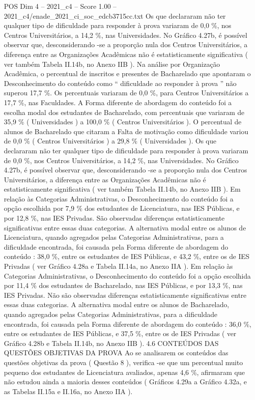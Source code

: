 \begin{textsample}{POS Dim 4 – 2021\_c4 – Score 1.00 – 2021\_c4/enade\_2021\_ci\_soc\_edcb3715cc.txt}
Os que declararam não ter qualquer tipo de dificuldade para responder à prova variaram de 0,0 \%, nos Centros Universitários, a 14,2 \%, nas Universidades.
No Gráfico 4.27b, é possível observar que, desconsiderando -se a proporção nula dos Centros Universitários, a diferença entre as Organizações Acadêmicas não é estatisticamente significativa ( ver também Tabela II.14b, no Anexo IIB ).
Na análise por Organização Acadêmica, o percentual de inscritos e presentes de Bacharelado que apontaram o Desconhecimento do conteúdo como “ dificuldade ao responder à prova ” não superou 17,7 \%.
Os percentuais variaram de 0,0 \%, para Centros Universitários a 17,7 \%, nas Faculdades.
A Forma diferente de abordagem do conteúdo foi a escolha modal dos estudantes de Bacharelado, com percentuais que variaram de 35,9 \% ( Universidades ) a 100,0 \% ( Centros Universitários ).
O percentual de alunos de Bacharelado que citaram a Falta de motivação como dificuldade variou de 0,0 \% ( Centros Universitários ) a 29,8 \% ( Universidades ).
Os que declararam não ter qualquer tipo de dificuldade para responder à prova variaram de 0,0 \%, nos Centros Universitários, a 14,2 \%, nas Universidades.
No Gráfico 4.27b, é possível observar que, desconsiderando -se a proporção nula dos Centros Universitários, a diferença entre as Organizações Acadêmicas não é estatisticamente significativa ( ver também Tabela II.14b, no Anexo IIB ).
Em relação às Categorias Administrativas, o Desconhecimento do conteúdo foi a opção escolhida por 7,9 \% dos estudantes de Licenciatura, nas IES Públicas, e por 12,8 \%, nas IES Privadas.
São observadas diferenças estatisticamente significativas entre essas duas categorias.
A alternativa modal entre os alunos de Licenciatura, quando agregados pelas Categorias Administrativas, para a dificuldade encontrada, foi causada pela Forma diferente de abordagem do conteúdo : 38,0 \%, entre os estudantes de IES Públicas, e 43,2 \%, entre os de IES Privadas ( ver Gráfico 4.28a e Tabela II.14a, no Anexo IIA ).
Em relação às Categorias Administrativas, o Desconhecimento do conteúdo foi a opção escolhida por 11,4 \% dos estudantes de Bacharelado, nas IES Públicas, e por 13,3 \%, nas IES Privadas.
Não são observadas diferenças estatisticamente significativas entre essas duas categorias.
A alternativa modal entre os alunos de Bacharelado, quando agregados pelas Categorias Administrativas, para a dificuldade encontrada, foi causada pela Forma diferente de abordagem do conteúdo : 36,0 \%, entre os estudantes de IES Públicas, e 37,5 \%, entre os de IES Privadas ( ver Gráfico 4.28b e Tabela II.14b, no Anexo IIB ). 4.6 CONTEÚDOS DAS QUESTÕES OBJETIVAS DA PROVA Ao se analisarem os conteúdos das questões objetivas da prova ( Questão 8 ), verifica -se que um percentual muito pequeno dos estudantes de Licenciatura avaliados, apenas 4,6 \%, afirmaram que não estudou ainda a maioria desses conteúdos ( Gráficos 4.29a a Gráfico 4.32a, e as Tabelas II.15a e II.16a, no Anexo IIA ).

\end{textsample}
